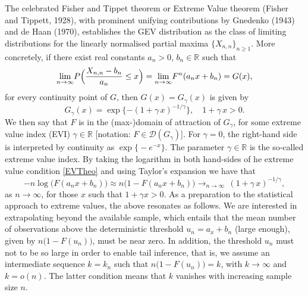 \documentclass[10pt, a4paper, oneside]{article}
\newcommand{\field}[1]{\mathbb{#1}}
\newcommand{\real}{\ensuremath{{\field{R}}}}
\newcommand{\arrowf}[1]{\ensuremath{\displaystyle {\mathop {\longrightarrow}_{#1 \rightarrow \infty}\,}}}
\newcommand{\limit}[1]{\ensuremath{\displaystyle {\lim_{#1 \rightarrow{\infty}}}}}
\begin{document}
The celebrated Fisher and Tippet theorem or Extreme Value theorem (Fisher and Tippett, 1928), with prominent unifying contributions by Gnedenko (1943) and de Haan (1970), establishes the GEV distribution as the class of limiting distributions for the linearly normalised partial maxima $\{X_{n,n} \}_{n\geq 1}$. More concretely, if there exist real constants $a_n>0$, $b_n \in \real$ such that
\begin{equation}\label{EVTheo}
	\limit{n} P \Bigl( \frac{X_{n,n}-b_n}{a_n} \leq x\Bigr)= \limit{n} F^n (a_n x + b_n) = G(x),
\end{equation}
for every continuity point of $G$, then $G(x)= G_{\gamma}(x)$ is given by
\begin{equation}\label{GEVd}
	G_{\gamma}(x)= \exp \{ -(1+ \gamma\, x)^{-1/\gamma}\}, \quad 1+\gamma\,x >0.
\end{equation}
We then say that $F$ is in the (max-)domain of attraction of $G_\gamma$,  for some extreme value index (EVI) $\gamma \in \real$ [notation: $F \in \mathcal{D}(G_{\gamma}) $]. For $\gamma=0$, the right-hand side is interpreted by continuity as $\exp\bigl\{-e^{-x}\bigr\}$. The parameter $\gamma \in \real$ is the so-called extreme value index.
By taking the logarithm in both hand-sides of he extreme value condition \eqref{EVTheo} and using Taylor's expansion we have that
\begin{equation*}
-n \log\bigl( F(a_n x + b_n)\bigr)\approx n\bigl(1-F(a_n x + b_n) \bigr) \arrowf{n} (1+ \gamma\, x)^{-1/\gamma},	
\end{equation*}
as $n\rightarrow \infty$, for those $x$ such that $1+\gamma x>0$. As a preparation to the statistical approach to extreme values, the above resonates as follows. We are interested in extrapolating beyond the available sample, which entails that the mean number of observations above the deterministic threshold $u_n=a_x+b_n$ (large enough), given by $n\bigl(1-F(u_n) \bigr)$, must be near zero. In addition, the threshold $u_n$ must not to be so large in order to enable tail inference, that is,  we assume an intermediate sequence $k=k_n$ such that $n\bigl(1-F(u_n) \bigr)=k$,  with $k\rightarrow \infty$ and $k=o(n)$. The latter condition means that $k$ vanishes with increasing sample size $n$.
\end{document}
